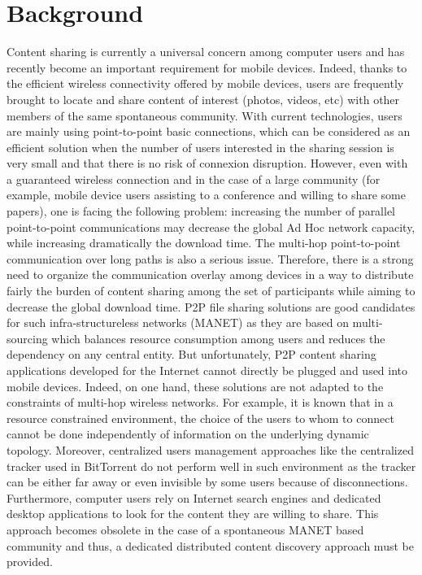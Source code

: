 ﻿\chapter{Background}
\label{chapter:background}
\minitoc

Content sharing is currently a universal concern among computer users and has recently become an important requirement for mobile devices. Indeed, thanks to the efficient wireless connectivity offered by mobile devices, users are frequently brought to locate and share content of interest (photos, videos, etc) with other members of the same spontaneous community. With current technologies, users are mainly using point-to-point basic connections, which can be considered as an efficient solution when the number of users interested in the sharing session is very small and that there is no risk of connexion disruption. However, even with a guaranteed wireless connection and in the case of a large community (for example, mobile device users assisting to a conference and willing to share some papers), one is facing the following problem: increasing the number of parallel point-to-point communications may decrease the global Ad Hoc network capacity, while increasing dramatically the download time. The multi-hop point-to-point communication over long paths is also a serious issue. Therefore, there is a strong need to organize the communication overlay among devices in a way to distribute fairly the burden of content sharing among the set of participants while aiming to decrease the global download time. P2P file sharing solutions are good candidates for such infra-structureless networks (MANET) as they are based on multi-sourcing which balances resource consumption among users and reduces the dependency on any central entity. But unfortunately, P2P content sharing applications developed for the Internet cannot directly be plugged and used into mobile devices. Indeed, on one hand, these solutions are not adapted to the constraints of multi-hop wireless networks. For example, it is known that in a resource constrained environment, the choice of the users to whom to connect cannot be done independently of information on the underlying dynamic topology. Moreover, centralized users management approaches like the centralized tracker used in BitTorrent do not perform well in such environment as the tracker can be either far away or even invisible by some users because of disconnections. Furthermore, computer users rely on Internet search engines and dedicated desktop applications to look for the content they are willing to share. This approach becomes obsolete in the case of a spontaneous MANET based community and thus, a dedicated distributed content discovery approach must be provided. 

